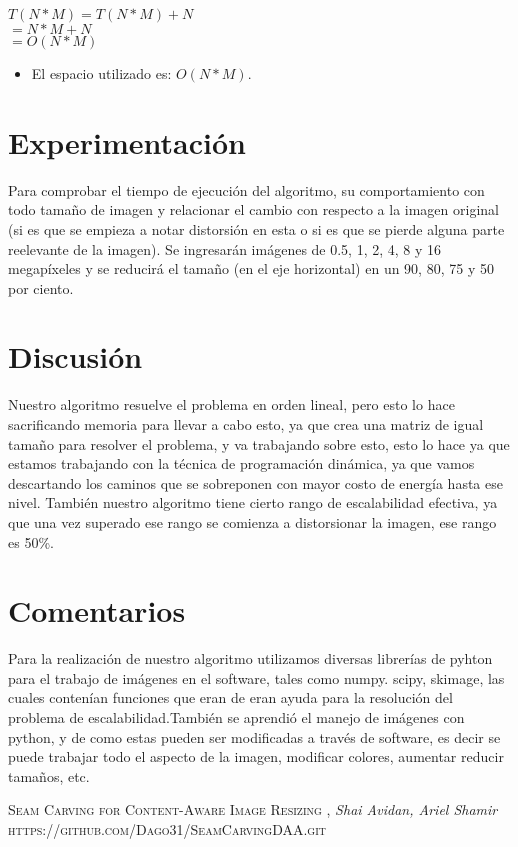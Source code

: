 \documentclass[twocolumn,11pts]{IEEEtran}
\begin{document}
$T(N*M)= T(N*M)+N$ \\
$      = N*M+N$\\
$      = O(N*M)$\\

\begin{itemize}
\item El espacio utilizado es: $O(N*M)$.
\end{itemize} 

\section{Experimentación}
Para comprobar el tiempo de ejecución del algoritmo, su comportamiento con todo tamaño de imagen y relacionar el cambio con respecto a la imagen original (si es que se empieza a notar distorsión en esta o si es que se pierde alguna parte reelevante de la imagen). Se ingresarán imágenes de 0.5, 1, 2, 4, 8 y 16 megapíxeles y se reducirá el tamaño (en el eje horizontal) en un 90, 80, 75 y 50 por ciento.

\section{Discusión}
Nuestro algoritmo resuelve el problema en orden lineal, pero esto lo hace sacrificando memoria para llevar a cabo esto, ya que crea una matriz de igual tamaño para resolver el problema, y va trabajando sobre esto, esto lo hace ya que estamos trabajando con la técnica de programación dinámica, ya que vamos descartando los caminos que se sobreponen con mayor costo de energía hasta ese nivel. También nuestro algoritmo tiene cierto rango de escalabilidad efectiva, ya que una vez superado ese rango se comienza a distorsionar la imagen, ese rango es 50\%.
\section{Comentarios}
Para la realización de nuestro algoritmo utilizamos diversas librerías de pyhton para el trabajo de imágenes en el software, tales como numpy. scipy, skimage, las cuales contenían funciones que eran de eran ayuda para la resolución del problema de escalabilidad.También se aprendió el manejo de imágenes con python, y de como estas pueden ser modificadas a través de software, es decir se puede trabajar todo el aspecto de la imagen, modificar colores, aumentar reducir tamaños, etc.
\begin{thebibliography}{x}
 \textsc{Seam Carving for Content-Aware Image Resizing },
\textit{Shai Avidan, Ariel Shamir}
 \textsc{https://github.com/Dago31/SeamCarvingDAA.git}
\end{thebibliography}
\end{document}
